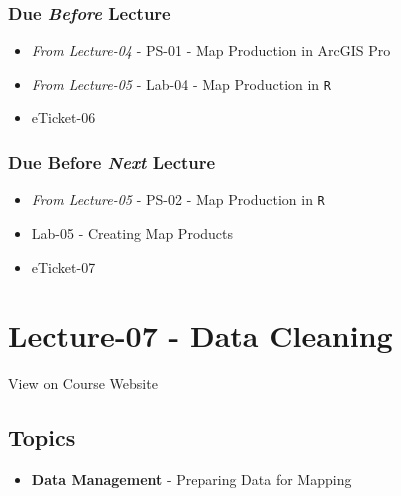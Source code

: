 \documentclass[]{book}
\providecommand{\tightlist}{%
  \setlength{\itemsep}{0pt}\setlength{\parskip}{0pt}}
\begin{document}
\hypertarget{due-before-lecture-5}{%
\subsubsection*{\texorpdfstring{Due \emph{Before} Lecture}{Due Before Lecture}}\label{due-before-lecture-5}}

\begin{itemize}
\tightlist
\item
  \emph{From Lecture-04} - PS-01 - Map Production in ArcGIS Pro
\item
  \emph{From Lecture-05} - Lab-04 - Map Production in \texttt{R}
\item
  eTicket-06
\end{itemize}

\hypertarget{due-before-next-lecture-4}{%
\subsubsection*{\texorpdfstring{Due Before \emph{Next} Lecture}{Due Before Next Lecture}}\label{due-before-next-lecture-4}}

\begin{itemize}
\tightlist
\item
  \emph{From Lecture-05} - PS-02 - Map Production in \texttt{R}
\item
  Lab-05 - Creating Map Products
\item
  eTicket-07
\end{itemize}

\hypertarget{lecture-07---data-cleaning}{%
\section*{Lecture-07 - Data Cleaning}\label{lecture-07---data-cleaning}}

View on Course Website

\hypertarget{topics-7}{%
\subsection*{Topics}\label{topics-7}}

\begin{itemize}
\tightlist
\item
  \textbf{Data Management} - Preparing Data for Mapping
\end{itemize}
\end{document}
